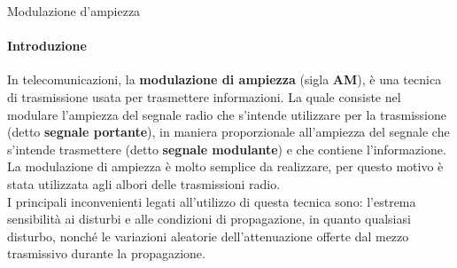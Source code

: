 \documentclass[aspectratio=169]{beamer}
\begin{document}
\begin{frame}{Modulazione d'ampiezza}
	\framesubtitle{Introduzione}
	In telecomunicazioni, la \textbf{modulazione di ampiezza} (sigla \textbf{AM}), è una tecnica di trasmissione usata per trasmettere informazioni. La quale consiste nel modulare l'ampiezza del segnale radio che s'intende utilizzare per la trasmissione (detto \textbf{segnale portante}), in maniera proporzionale all'ampiezza del segnale che s'intende trasmettere (detto \textbf{segnale modulante}) e che contiene l'informazione.\\
	\medskip
	La modulazione di ampiezza è molto semplice da realizzare, per questo motivo è stata utilizzata agli albori delle trasmissioni radio.\\
	\medskip
	I principali inconvenienti legati all'utilizzo di questa tecnica sono: l'estrema sensibilità ai disturbi e alle condizioni di propagazione, in quanto qualsiasi disturbo, nonché le variazioni aleatorie dell'attenuazione offerte dal mezzo trasmissivo durante la propagazione.
\end{frame}
\end{document}
